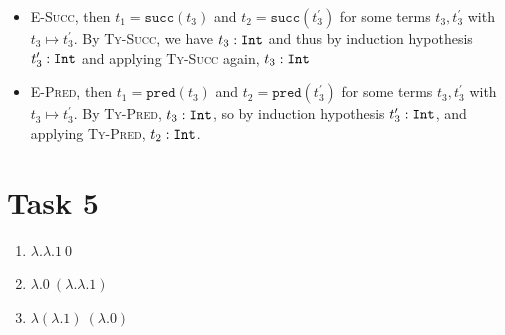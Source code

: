 \documentclass{article}
\newcommand{\tyint}{\ensuremath\mathtt{Int}}
\begin{document}
\begin{enumerate}
\begin{itemize}
\begin{itemize}
      \item \textsc{E-Succ}, then $t_1 = \mathtt{succ}(t_3)$ and $t_2=\mathtt{succ}(t_3^{\prime})$ for some terms $t_3,t_3^{\prime}$ with $t_3\mapsto t_3^{\prime}$. By \textsc{Ty-Succ}, we have $t_3:\tyint$ and thus by induction hypothesis $t_3^{\prime}:\tyint$ and applying \textsc{Ty-Succ} again, $t_3:\tyint$
      \item \textsc{E-Pred}, then $t_1= \mathtt{pred}(t_3)$ and $t_2=\mathtt{pred}(t_3^{\prime})$ for some terms $t_3,t_3^{\prime}$ with $t_3\mapsto t_3^{\prime}$. By \textsc{Ty-Pred}, $t_3:\tyint$, so by induction hypothesis $t_3^{\prime}:\tyint$, and applying \textsc{Ty-Pred}, $t_2:\tyint$.
    \end{itemize}
\end{itemize}
\end{enumerate}

\section*{Task 5}

\begin{enumerate}
  \item $\lambda.\lambda.1\ 0$
  \item $\lambda.0\ (\lambda.\lambda.1)$
  \item $\lambda (\lambda.1)\ (\lambda.0)$
\end{enumerate}
\end{document}

